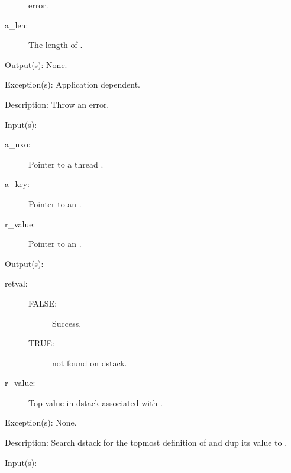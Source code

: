 \begin{capi}
\begin{capilist}
\begin{description}
			error.
		\item[a\_len: ]
			The length of .
		\end{description}
	\item[Output(s): ] None.
	\item[Exception(s): ] Application dependent.
	\item[Description: ]
		Throw an error.
	\end{capilist}
\label{nxo_thread_dstack_search}
	\begin{capilist}
	\item[Input(s): ]
		\begin{description}\item[]
		\item[a\_nxo: ]
			Pointer to a thread .
		\item[a\_key: ]
			Pointer to an .
		\item[r\_value: ]
			Pointer to an .
		\end{description}
	\item[Output(s): ]
		\begin{description}\item[]
		\item[retval: ]
			\begin{description}\item[]
			\item[FALSE: ]
				Success.
			\item[TRUE: ]
				 not found on dstack.
			\end{description}
		\item[r\_value: ]
			Top value in dstack associated with .
		\end{description}
	\item[Exception(s): ] None.
	\item[Description: ]
		Search dstack for the topmost definition of  and
		dup its value to .
	\end{capilist}
\label{nxo_thread_currentlocking}
	\begin{capilist}
	\item[Input(s): ]
		\begin{description}\item[]

\end{description}
\end{capilist}
\end{capi}
